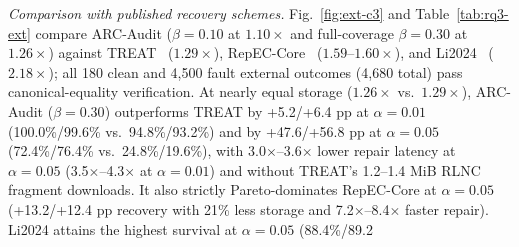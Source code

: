 \documentclass[10pt,journal]{IEEEtran}
\begin{document}
\emph{Comparison with published recovery schemes.}
Fig.~\ref{fig:ext-c3} and Table~\ref{tab:rq3-ext} compare ARC-Audit ($\beta{=}0.10$ at $1.10\times$ and full-coverage $\beta{=}0.30$ at $1.26\times$) against TREAT~\cite{Taurone2024TREAT} ($1.29\times$), RepEC-Core~\cite{Zuo2022RepECPlus} ($1.59$--$1.60\times$), and Li2024~\cite{Li2024TNSE} ($2.18\times$); all 180 clean and 4,500 fault external outcomes (4,680 total) pass canonical-equality verification. At nearly equal storage ($1.26\times$ vs.\ $1.29\times$), ARC-Audit ($\beta{=}0.30$) outperforms TREAT by +5.2/+6.4 pp at $\alpha{=}0.01$ (100.0\%/99.6\% vs.\ 94.8\%/93.2\%) and by +47.6/+56.8 pp at $\alpha{=}0.05$ (72.4\%/76.4\% vs.\ 24.8\%/19.6\%), with 3.0$\times$--3.6$\times$ lower repair latency at $\alpha{=}0.05$ (3.5$\times$--4.3$\times$ at $\alpha{=}0.01$) and without TREAT's 1.2--1.4 MiB RLNC fragment downloads. It also strictly Pareto-dominates RepEC-Core at $\alpha{=}0.05$ (+13.2/+12.4 pp recovery with 21\% less storage and 7.2$\times$--8.4$\times$ faster repair). Li2024 attains the highest survival at $\alpha{=}0.05$ (88.4\%/89.2%
\end{document}
